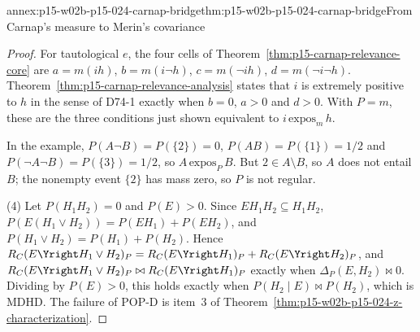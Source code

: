 \begin{annexitem}{annex:p15-w02b-p15-024-carnap-bridge}{thm:p15-w02b-p15-024-carnap-bridge}{From Carnap's measure to Merin's covariance}
\begin{proof}
For tautological \(e\), the four cells of
Theorem~\ref{thm:p15-carnap-relevance-core} are
\(a=m(ih)\), \(b=m(i\neg h)\), \(c=m(\neg ih)\), \(d=m(\neg i\neg h)\).
Theorem~\ref{thm:p15-carnap-relevance-analysis} states that \(i\) is
extremely positive to \(h\) in the sense of D74-1 exactly when \(b=0\),
\(a>0\) and \(d>0\). With \(P=m\), these are the three conditions just
shown equivalent to \(i\,\mathrm{expos}_m\,h\).

In the example, \(P(A\neg B)=P(\{2\})=0\), \(P(AB)=P(\{1\})=1/2\) and
\(P(\neg A\neg B)=P(\{3\})=1/2\), so \(A\,\mathrm{expos}_P\,B\). But
\(2\in A\setminus B\), so \(A\) does not entail \(B\); the nonempty event
\(\{2\}\) has mass zero, so \(P\) is not regular.

(4) Let \(P(H_1H_2)=0\) and \(P(E)>0\). Since \(EH_1H_2\subseteq H_1H_2\),
\(P(E(H_1\lor H_2))=P(EH_1)+P(EH_2)\), and
\(P(H_1\lor H_2)=P(H_1)+P(H_2)\). Hence
\(R_C(E\Yright H_1\lor H_2)_P=R_C(E\Yright H_1)_P+R_C(E\Yright H_2)_P\),
and \(R_C(E\Yright H_1\lor H_2)_P\bowtie R_C(E\Yright H_1)_P\) exactly
when \(\Delta_P(E,H_2)\bowtie0\). Dividing by \(P(E)>0\), this holds
exactly when \(P(H_2\mid E)\bowtie P(H_2)\), which is MDHD. The failure of
POP-D is item~3 of Theorem~\ref{thm:p15-w02b-p15-024-z-characterization}.
\end{proof}
\end{annexitem}

